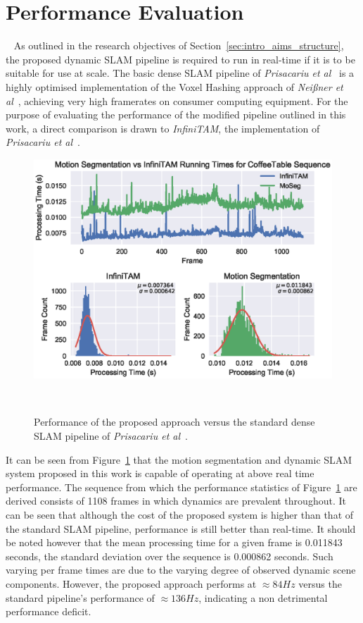 \section{Performance Evaluation}
~\label{sec:moseg_performance}
As outlined in the research objectives of Section~\ref{sec:intro_aims_structure}, the proposed 
dynamic SLAM pipeline is required to run in real-time if it is to be suitable for use at scale. 
The basic dense SLAM pipeline of \textit{Prisacariu et al}~\cite{Prisacariu2014} is a highly 
optimised implementation of the Voxel Hashing approach of \textit{Nei{\ss}ner et al}~\cite{NieBner2013}, 
achieving very high framerates on consumer computing equipment. For the purpose of evaluating the 
performance of the modified pipeline outlined in this work, a direct comparison is drawn to 
\textit{InfiniTAM}, the implementation of \textit{Prisacariu et al}~\cite{Prisacariu2014}.
\begin{figure}[!htbp]
  \centering
  \includegraphics[width=\linewidth]{figures/moseg/timings_coffee.eps}
  \caption[Motion Segmentation Performance on CoffeeTable Sequence]
  {Performance of the proposed approach versus the standard dense SLAM pipeline of 
  \textit{Prisacariu et al}~\cite{Prisacariu2014}.}
~\label{figure:moseg_timing_coffee}
\end{figure}

It can be seen from Figure~\ref{figure:moseg_timing_coffee} that the motion segmentation and 
dynamic SLAM system proposed in this work is capable of operating at above real time performance. The 
sequence from which the performance statistics of Figure~\ref{figure:moseg_timing_coffee} are derived 
consists of 1108 frames in which dynamics are prevalent throughout. It can be seen that although the 
cost of the proposed system is higher than that of the standard SLAM pipeline, performance is still 
better than real-time. It should be noted however that the mean processing time for a given frame 
is 0.011843 seconds, the standard deviation over the sequence is 0.000862 seconds. Such varying per 
frame times are due to the varying degree of observed dynamic scene components. However, the proposed 
approach performs at \(\approx 84Hz\) versus the standard pipeline's performance of \(\approx 136Hz\), 
indicating a non detrimental performance deficit.


